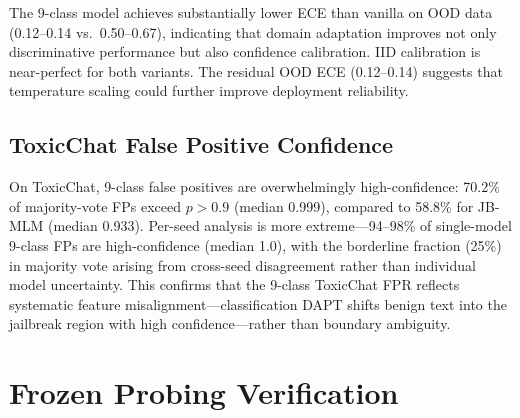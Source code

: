 The 9-class model achieves substantially lower ECE than vanilla on OOD data (0.12--0.14 vs.\ 0.50--0.67), indicating that domain adaptation improves not only discriminative performance but also confidence calibration. IID calibration is near-perfect for both variants. The residual OOD ECE (0.12--0.14) suggests that temperature scaling could further improve deployment reliability.

\subsection{ToxicChat False Positive Confidence}
\label{app:confidence}

On ToxicChat, 9-class false positives are overwhelmingly high-confidence: 70.2\% of majority-vote FPs exceed $p > 0.9$ (median 0.999), compared to 58.8\% for JB-MLM (median 0.933). Per-seed analysis is more extreme---94--98\% of single-model 9-class FPs are high-confidence (median 1.0), with the borderline fraction (25\%) in majority vote arising from cross-seed disagreement rather than individual model uncertainty. This confirms that the 9-class ToxicChat FPR reflects systematic feature misalignment---classification DAPT shifts benign text into the jailbreak region with high confidence---rather than boundary ambiguity.

\section{Frozen Probing Verification}
\label{app:frozen_verify}

\begin{table}[ht]
\centering
\footnotesize
\caption{Frozen probing vs.\ end-to-end (E2E) fine-tuning (3-seed mean$\pm$std). 9-class: primary DAPT checkpoints; MLM: matched MLM control checkpoints. Frozen probing trains only BiGRU+MLP on frozen DAPT embeddings.}
\label{tab:frozen_verify}
\end{table}


